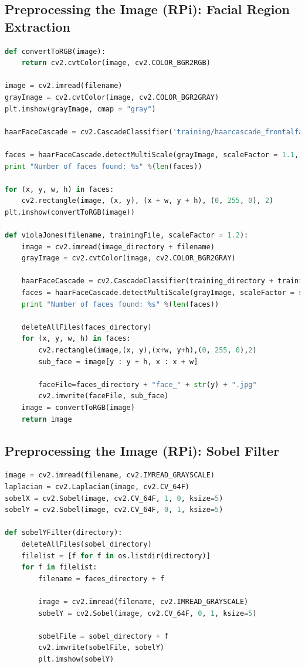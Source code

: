 \subsection{Preprocessing the Image (RPi): Facial Region Extraction}
\begin{lstlisting}[language=python]
def convertToRGB(image):
    return cv2.cvtColor(image, cv2.COLOR_BGR2RGB)

image = cv2.imread(filename)
grayImage = cv2.cvtColor(image, cv2.COLOR_BGR2GRAY)
plt.imshow(grayImage, cmap = "gray")

haarFaceCascade = cv2.CascadeClassifier('training/haarcascade_frontalface_alt.xml')

faces = haarFaceCascade.detectMultiScale(grayImage, scaleFactor = 1.1, minNeighbors = 5)
print "Number of faces found: %s" %(len(faces))

for (x, y, w, h) in faces:
    cv2.rectangle(image, (x, y), (x + w, y + h), (0, 255, 0), 2)
plt.imshow(convertToRGB(image))

def violaJones(filename, trainingFile, scaleFactor = 1.2):
    image = cv2.imread(image_directory + filename)
    grayImage = cv2.cvtColor(image, cv2.COLOR_BGR2GRAY)
    
    haarFaceCascade = cv2.CascadeClassifier(training_directory + trainingFile)
    faces = haarFaceCascade.detectMultiScale(grayImage, scaleFactor = scaleFactor, minNeighbors = 5)
    print "Number of faces found: %s" %(len(faces))

    deleteAllFiles(faces_directory)
    for (x, y, w, h) in faces:
        cv2.rectangle(image,(x, y),(x+w, y+h),(0, 255, 0),2)
        sub_face = image[y : y + h, x : x + w]
        
        faceFile=faces_directory + "face_" + str(y) + ".jpg"
        cv2.imwrite(faceFile, sub_face)
    image = convertToRGB(image)
    return image
\end{lstlisting}


\subsection{Preprocessing the Image (RPi): Sobel Filter}
\begin{lstlisting}[language=python]
image = cv2.imread(filename, cv2.IMREAD_GRAYSCALE)
laplacian = cv2.Laplacian(image, cv2.CV_64F)
sobelX = cv2.Sobel(image, cv2.CV_64F, 1, 0, ksize=5)
sobelY = cv2.Sobel(image, cv2.CV_64F, 0, 1, ksize=5)

def sobelYFilter(directory):
    deleteAllFiles(sobel_directory)
    filelist = [f for f in os.listdir(directory)]
    for f in filelist:
        filename = faces_directory + f

        image = cv2.imread(filename, cv2.IMREAD_GRAYSCALE)
        sobelY = cv2.Sobel(image, cv2.CV_64F, 0, 1, ksize=5)
        
        sobelFile = sobel_directory + f
        cv2.imwrite(sobelFile, sobelY)
        plt.imshow(sobelY)
\end{lstlisting}

